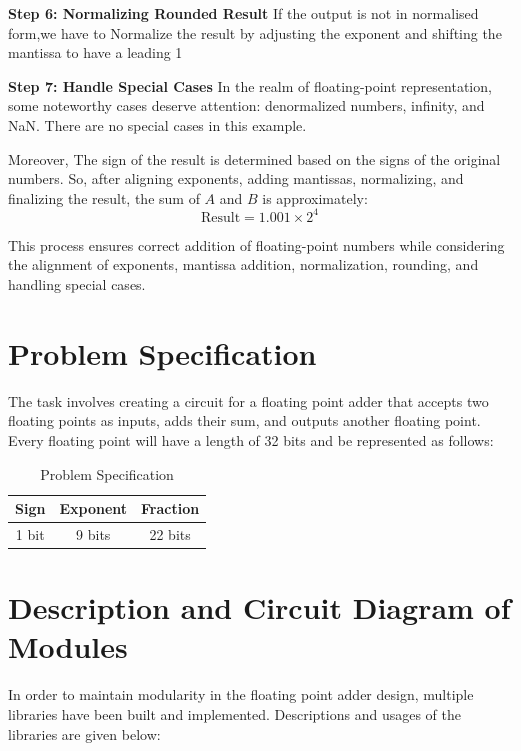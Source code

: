 \documentclass[a4paper,12pt]{article}
\begin{document}
\textbf{Step 6: Normalizing Rounded Result}
If the output is not in normalised form,we have to  Normalize the result by adjusting the exponent and shifting the mantissa to have a leading 1

\textbf{Step 7: Handle Special Cases}
In the realm of floating-point representation, some noteworthy cases deserve attention: denormalized numbers, infinity, and NaN.
There are no special cases in this example.

Moreover, The sign of the result is determined based on the signs of the
original numbers. So, after aligning exponents, adding mantissas, normalizing,
and finalizing the result, the sum of \( A \) and \( B \) is approximately:
\[
    \text{Result} = 1.001 \times 2^4
\]

This process ensures correct addition of floating-point numbers while
considering the alignment of exponents, mantissa addition, normalization,
rounding, and handling special cases.

\vspace{1cm}

\section{Problem Specification}

The task involves creating a circuit for a floating point adder that accepts
two floating points as inputs, adds their sum, and outputs another floating
point. Every floating point will have a length of 32 bits and be represented as
follows:
\begin{table}[h]
    \centering
    \begin{tabular}{|c|c|c|}
        \hline
        \textbf{Sign} & \textbf{Exponent} & \textbf{Fraction} \\
        \hline
        1 bit         & 9 bits            & 22 bits           \\
        \hline
    \end{tabular}
    \caption{Problem Specification}
    \label{tab:table1}
\end{table}

\section{Description and Circuit Diagram of Modules}
In order to maintain modularity in the floating point adder design, multiple
libraries have been built and implemented. Descriptions and usages of the
libraries are given below:
\end{document}
